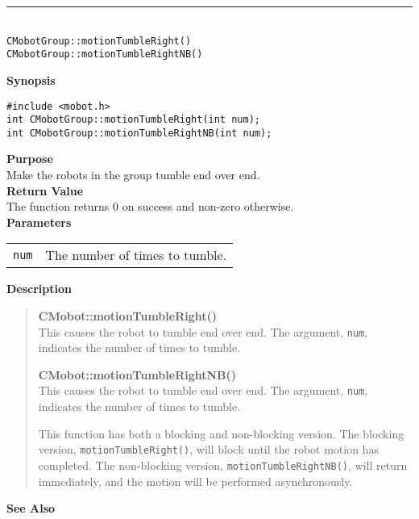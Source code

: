 \noindent
\vspace{5pt}
\rule{4.5in}{0.015in}\\
\noindent
{\LARGE \texttt{CMobotGroup::motionTumbleRight()}}\\
{\LARGE \texttt{CMobotGroup::motionTumbleRightNB()}}\\
{}

\noindent
{\bf Synopsis}
\vspace{-8pt}
\begin{verbatim}
#include <mobot.h>
int CMobotGroup::motionTumbleRight(int num);
int CMobotGroup::motionTumbleRightNB(int num);
\end{verbatim}

\noindent
{\bf Purpose}\\
Make the robots in the group tumble end over end.\\

\noindent
{\bf Return Value}\\
The function returns 0 on success and non-zero otherwise.\\

\noindent
{\bf Parameters}\\
\vspace{-0.1in}
\begin{description}
\item               
\begin{tabular}{p{10 mm}p{145 mm}}
\texttt{num} & The number of times to tumble. \\
\end{tabular}
\end{description}

\noindent
{\bf Description}\\
\vspace{-12pt}
\begin{quote}
{\bf CMobot::motionTumbleRight()}\\
This causes the robot to tumble end over end. The argument, \texttt{num},
indicates the number of times to tumble.

{\bf CMobot::motionTumbleRightNB()}\\
This causes the robot to tumble end over end. The argument, \texttt{num},
indicates the number of times to tumble.

This function has both a blocking and non-blocking version.
The blocking version, \texttt{motionTumbleRight()}, will block until the
robot motion has completed. The non-blocking version, \texttt{motionTumbleRightNB()},
will return immediately, and the motion will be performed asynchronously.\\
\end{quote}

\noindent
{\bf See Also}\\

